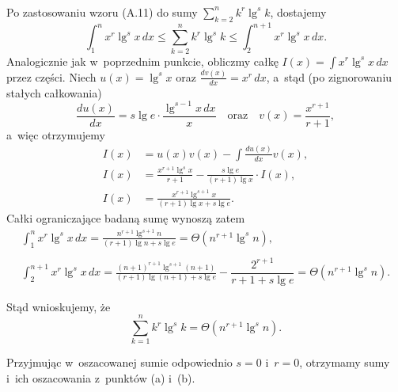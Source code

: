\subsubsection{} %
Po zastosowaniu wzoru (A.11) do sumy $\sum_{k=2}^nk^r\lg^sk$, dostajemy
\[
	\int_1^nx^r\lg^sx\,dx \le \sum_{k=2}^nk^r\lg^sk \le \int_2^{n+1}x^r\lg^sx\,dx.
\]
Analogicznie jak w~poprzednim punkcie, obliczmy całkę $I(x) = \int x^r\lg^sx\,dx$ przez części. Niech $u(x)=\lg^sx$ oraz $\frac{dv(x)}{dx}=x^r\,dx$, a~stąd (po zignorowaniu stałych całkowania)
\[
	\frac{du(x)}{dx} = s\lg e\cdot\frac{\lg^{s-1}x\,dx}{x} \quad\text{oraz}\quad v(x) = \frac{x^{r+1}}{r+1},
\]
a~więc otrzymujemy
\begin{align*}
	I(x) &= u(x)v(x)-\int\frac{du(x)}{dx}v(x), \\
	I(x) &= \frac{x^{r+1}\lg^sx}{r+1}-\frac{s\lg e}{(r+1)\lg x}\cdot I(x), \\
	I(x) &= \frac{x^{r+1}\lg^{s+1}x}{(r+1)\lg x+s\lg e}.
\end{align*}
Całki ograniczające badaną sumę wynoszą zatem
\begin{gather*}
	{\int_1^nx^r\lg^sx\,dx} = \frac{n^{r+1}\lg^{s+1}n}{(r+1)\lg n+s\lg e} = \Theta(n^{r+1}\lg^sn), \\\\
	{\int_2^{n+1}x^r\lg^sx\,dx} = \frac{(n+1)^{r+1}\lg^{s+1}(n+1)}{(r+1)\lg(n+1)+s\lg e}-\dfrac{2^{r+1}}{r+1+s\lg e} = \Theta(n^{r+1}\lg^sn).
\end{gather*}

Stąd wnioskujemy, że
\[
	\sum_{k=1}^nk^r\lg^sk = \Theta(n^{r+1}\lg^sn).
\]

Przyjmując w~oszacowanej sumie odpowiednio $s=0$ i~$r=0$, otrzymamy sumy i~ich oszacowania z~punktów (a) i~(b).

\endinput
